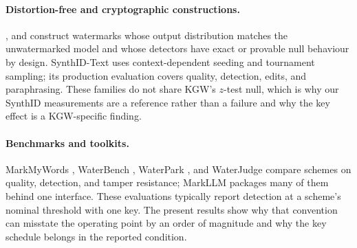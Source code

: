 \documentclass[conference]{IEEEtran}
\begin{document}
\paragraph{Distortion-free and cryptographic constructions.}
\citet{kuditipudi2023robust}, \citet{christ2023undetectable} and
\citet{hu2024unbiased} construct watermarks whose output distribution matches the
unwatermarked model and whose
detectors have exact or provable null behaviour by design. SynthID-Text
\citep{dathathri2024synthid} uses context-dependent seeding and tournament
sampling; its production evaluation covers quality, detection, edits, and
paraphrasing. These families do not share KGW's $z$-test null, which is why our
SynthID measurements are a reference rather than a failure and why the key effect
is a KGW-specific finding.

\paragraph{Benchmarks and toolkits.}
MarkMyWords \citep{piet2023markmywords}, WaterBench \citep{tu2024waterbench},
WaterPark \citep{liang2025waterpark}, and WaterJudge \citep{molenda2024waterjudge}
compare schemes on quality, detection, and tamper resistance; MarkLLM
\citep{pan2024markllm} packages many of them behind one interface. These
evaluations typically report detection at a scheme's nominal threshold with one
key. The present results show why that convention can misstate the operating
point by an order of magnitude and why the key schedule belongs in the reported
condition.
\end{document}
